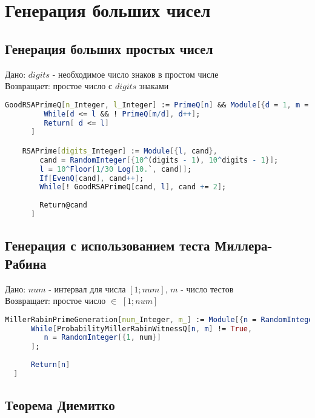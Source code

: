 
\chapter{Генерация больших чисел}

  \section{Генерация больших простых чисел}

    Дано: {$digits$} - необходимое число знаков в простом числе \\
    Возвращает: простое число с  {$digits$} знаками

    \begin{lstlisting}[language=Mathematica,caption={
      Генерация больших простых чисел
    }]
    GoodRSAPrimeQ[n_Integer, l_Integer] := PrimeQ[n] && Module[{d = 1, m = (n - 1)/2},
	     While[d <= l && ! PrimeQ[m/d], d++];
	     Return[ d <= l]
	  ]

    RSAPrime[digits_Integer] := Module[{l, cand},
        cand = RandomInteger[{10^(digits - 1), 10^digits - 1}];
        l = 10^Floor[1/30 Log[10.`, cand]];
        If[EvenQ[cand], cand++];
        While[! GoodRSAPrimeQ[cand, l], cand += 2];
        
        Return@cand
      ]

    \end{lstlisting}

  \section{Генерация с использованием теста Миллера-Рабина}

    Дано: {$num$} - интервал для числа {$[1;num]$}, {$m$} - число тестов \\
    Возвращает: простое число {$\in$} {$[1;num]$}

    \begin{lstlisting}[language=Mathematica,caption={
      Генерация с использованием теста Миллера-Рабина  
    }]
  MillerRabinPrimeGeneration[num_Integer, m_] := Module[{n = RandomInteger[{1, num}]},
      While[ProbabilityMillerRabinWitnessQ[n, m] != True, 
         n = RandomInteger[{1, num}]
      ];
      
      Return[n]
  ]
    \end{lstlisting}

  \section{Теорема Диемитко}

